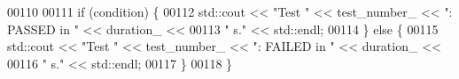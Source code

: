 \begin{DoxyCode}
00110 
00111   \textcolor{keywordflow}{if} (condition) \{
00112     std::cout << \textcolor{stringliteral}{"Test "} << test\_number\_ << \textcolor{stringliteral}{": PASSED in "} << duration\_ <<
00113       \textcolor{stringliteral}{" s."} << std::endl;
00114   \} \textcolor{keywordflow}{else} \{
00115     std::cout << \textcolor{stringliteral}{"Test "} << test\_number\_ << \textcolor{stringliteral}{": FAILED in "} << duration\_ <<
00116       \textcolor{stringliteral}{" s."} << std::endl;
00117   \}
00118 \}
\end{DoxyCode}
